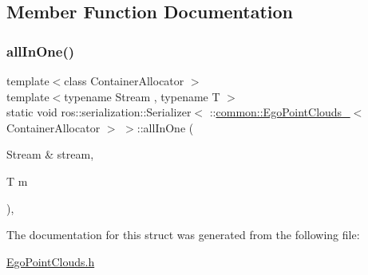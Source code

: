 \subsection{Member Function Documentation}
\mbox{\label{structros_1_1serialization_1_1Serializer_3_01_1_1common_1_1EgoPointClouds___3_01ContainerAllocator_01_4_01_4_a1cc360a582bdaaa1653f226a214b7665}} 
\subsubsection{\texorpdfstring{all\+In\+One()}{allInOne()}}
{\footnotesize\ttfamily template$<$class Container\+Allocator $>$ \\
template$<$typename Stream , typename T $>$ \\
static void ros\+::serialization\+::\+Serializer$<$ \+::\hyperlink{structcommon_1_1EgoPointClouds__}{common\+::\+Ego\+Point\+Clouds\+\_\+}$<$ Container\+Allocator $>$ $>$\+::all\+In\+One (\begin{DoxyParamCaption}\item[{Stream \&}]{stream,  }\item[{T}]{m }\end{DoxyParamCaption})\hspace{0.3cm}{\ttfamily [inline]}, {\ttfamily [static]}}



The documentation for this struct was generated from the following file\+:\begin{DoxyCompactItemize}
\item 
\hyperlink{EgoPointClouds_8h}{Ego\+Point\+Clouds.\+h}\end{DoxyCompactItemize}
